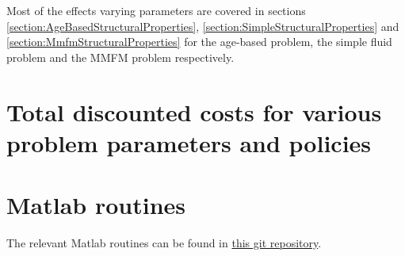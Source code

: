 Most of the effects varying parameters are covered in sections \ref{section:AgeBasedStructuralProperties}, \ref{section:SimpleStructuralProperties} and \ref{section:MmfmStructuralProperties} for the age-based problem, the simple fluid problem and the MMFM problem respectively.




\begin{appendices}
	
	
\chapter{Total discounted costs for various problem parameters and policies}\label{AppendixComputationsTable}

\chapter{Matlab routines}
The relevant Matlab routines can be found in
\href{https://github.com/MartijnGosgens/preventive-maintenance.git}{this git repository}.
\end{appendices}

